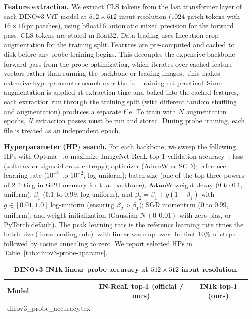 \documentclass{article}
\makeatletter
\newcommand{\inputrows}[1]{\@@input #1 }
\makeatother
\begin{document}
\textbf{Feature extraction.} We extract CLS tokens from the last transformer layer of each DINOv3 ViT model at $512 \times 512$ input resolution (1024 patch tokens with $16 \times 16$\,px patches), using bfloat16 automatic mixed precision for the forward pass. CLS tokens are stored in float32. Data loading uses Inception-crop augmentation for the training split. Features are pre-computed and cached to disk before any probe training begins. This decouples the expensive backbone forward pass from the probe optimization, which iterates over cached feature vectors rather than running the backbone or loading images. This makes extensive hyperparameter search over the full training set practical. Since augmentation is applied at extraction time and baked into the cached features, each extraction run through the training split (with different random shuffling and augmentation) produces a separate file. To train with $N$ augmentation epochs, $N$ extraction passes must be run and stored. During probe training, each file is treated as an independent epoch.

\textbf{Hyperparameter (HP) search.} For each backbone, we sweep the following HPs with Optuna~\cite{akibaOptunaNextgenerationHyperparameter2019} to maximize ImageNet-ReaL top-1 validation accuracy~\cite{beyerAreWeDone2020}: loss (softmax or sigmoid cross-entropy); optimizer (AdamW or SGD); reference learning rate ($10^{-7}$ to $10^{-2}$, log-uniform); batch size (one of the top three powers of 2 fitting in GPU memory for that backbone); AdamW weight decay ($0$ to $0.1$, uniform), $\beta_1$ ($0.1$ to $0.99$, log-uniform), and $\beta_2 = \beta_1 + g (1 - \beta_1)$ with $g \in [0.01, 1.0]$ log-uniform (ensuring $\beta_2 > \beta_1$); SGD momentum ($0$ to $0.99$, uniform); and weight initialization (Gaussian $\mathcal{N}(0, 0.01)$ with zero bias, or PyTorch default). The peak learning rate is the reference learning rate times the batch size (linear scaling rule), with linear warmup over the first 10\% of steps followed by cosine annealing to zero. We report selected HPs in Table~\ref{tab:dinov3-probe-hparams}.

\begin{table}[h]
  \caption{\textbf{DINOv3 IN1k linear probe accuracy at $512 \times 512$ input resolution.}}
  \label{tab:dinov3-probes}
  \centering
  \begin{tabular}{lcc}
    \toprule
    \textbf{Model} & \textbf{IN-ReaL top-1 (official / ours)} & \textbf{IN1k top-1 (ours)} \\
    \midrule
    \inputrows{dinov3_probe_accuracy.tex}
    \bottomrule
  \end{tabular}
\end{table}
\end{document}
